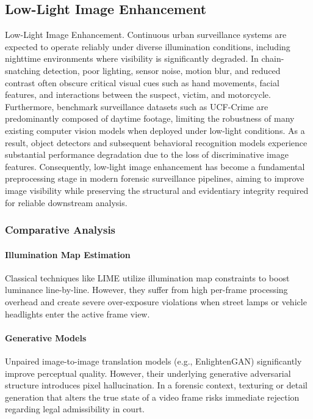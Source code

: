 \documentclass[conference]{IEEEtran}
\begin{document}
\subsection{Low-Light Image Enhancement}
Low-Light Image Enhancement. Continuous urban surveillance systems are expected to operate reliably under diverse illumination conditions, including nighttime environments where visibility is significantly degraded. In chain-snatching detection, poor lighting, sensor noise, motion blur, and reduced contrast often obscure critical visual cues such as hand movements, facial features, and interactions between the suspect, victim, and motorcycle. Furthermore, benchmark surveillance datasets such as UCF-Crime are predominantly composed of daytime footage, limiting the robustness of many existing computer vision models when deployed under low-light conditions. As a result, object detectors and subsequent behavioral recognition models experience substantial performance degradation due to the loss of discriminative image features. Consequently, low-light image enhancement has become a fundamental preprocessing stage in modern forensic surveillance pipelines, aiming to improve image visibility while preserving the structural and evidentiary integrity required for reliable downstream analysis.


\subsubsection{Comparative Analysis}
\paragraph{Illumination Map Estimation} Classical techniques like LIME utilize illumination map constraints to boost luminance line-by-line. However, they suffer from high per-frame processing overhead and create severe over-exposure violations when street lamps or vehicle headlights enter the active frame view.

\paragraph{Generative Models} Unpaired image-to-image translation models (e.g., EnlightenGAN) significantly improve perceptual quality. However, their underlying generative adversarial structure introduces pixel hallucination. In a forensic context, texturing or detail generation that alters the true state of a video frame risks immediate rejection regarding legal admissibility in court.
\end{document}
